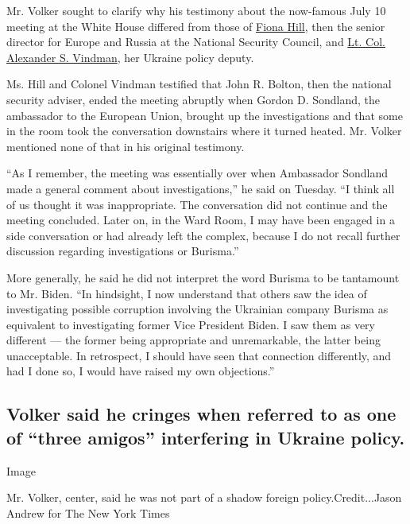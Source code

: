 Mr. Volker sought to clarify why his testimony about the now-famous July
10 meeting at the White House differed from those of
\href{https://www.nytimes.com/2019/11/21/us/politics/impeachment-hearing.html}{Fiona
Hill}, then the senior director for Europe and Russia at the National
Security Council, and
\href{https://www.nytimes.com/2019/11/19/us/alexander-vindman.html}{Lt.
Col. Alexander S. Vindman}, her Ukraine policy deputy.

Ms. Hill and Colonel Vindman testified that John R. Bolton, then the
national security adviser, ended the meeting abruptly when Gordon D.
Sondland, the ambassador to the European Union, brought up the
investigations and that some in the room took the conversation
downstairs where it turned heated. Mr. Volker mentioned none of that in
his original testimony.

``As I remember, the meeting was essentially over when Ambassador
Sondland made a general comment about investigations,'' he said on
Tuesday. ``I think all of us thought it was inappropriate. The
conversation did not continue and the meeting concluded. Later on, in
the Ward Room, I may have been engaged in a side conversation or had
already left the complex, because I do not recall further discussion
regarding investigations or Burisma.''

More generally, he said he did not interpret the word Burisma to be
tantamount to Mr. Biden. ``In hindsight, I now understand that others
saw the idea of investigating possible corruption involving the
Ukrainian company Burisma as equivalent to investigating former Vice
President Biden. I saw them as very different --- the former being
appropriate and unremarkable, the latter being unacceptable. In
retrospect, I should have seen that connection differently, and had I
done so, I would have raised my own objections.''

\hypertarget{volker-said-he-cringes-when-referred-to-as-one-of-three-amigos-interfering-in-ukraine-policy}{%
\subsection{Volker said he cringes when referred to as one of ``three
amigos'' interfering in Ukraine
policy.}\label{volker-said-he-cringes-when-referred-to-as-one-of-three-amigos-interfering-in-ukraine-policy}}

Image

Mr. Volker, center, said he was not part of a shadow foreign
policy.Credit...Jason Andrew for The New York Times

